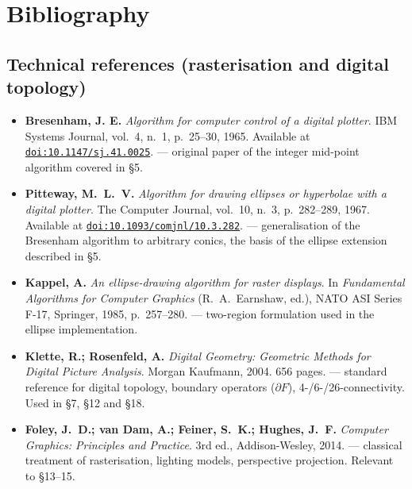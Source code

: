 \documentclass[12pt,a4paper]{scrartcl}
\newcommand{\biblink}[2]{\href{#1}{\nolinkurl{#2}}}
\begin{document}
\section*{\color{accent}Bibliography}
\label{sec:bib}

\subsection*{Technical references (rasterisation and digital topology)}

\begin{itemize}[leftmargin=1.4em,itemsep=0.3em,topsep=0.3em]
  \item \textbf{Bresenham, J. E.} \emph{Algorithm for computer control of a digital plotter}.
        IBM Systems Journal, vol.~4, n.~1, p.~25--30, 1965.
        Available at \biblink{https://doi.org/10.1147/sj.41.0025}{doi:10.1147/sj.41.0025}.
        --- original paper of the integer mid-point algorithm covered in §5.

  \item \textbf{Pitteway, M.~L.~V.} \emph{Algorithm for drawing ellipses or hyperbolae
        with a digital plotter}. The Computer Journal, vol.~10, n.~3, p.~282--289, 1967.
        Available at \biblink{https://doi.org/10.1093/comjnl/10.3.282}{doi:10.1093/comjnl/10.3.282}.
        --- generalisation of the Bresenham algorithm to arbitrary conics, the basis of the ellipse extension described in §5.

  \item \textbf{Kappel, A.} \emph{An ellipse-drawing algorithm for raster displays}.
        In \emph{Fundamental Algorithms for Computer Graphics} (R.~A.~Earnshaw, ed.),
        NATO ASI Series F-17, Springer, 1985, p.~257--280.
        --- two-region formulation used in the ellipse implementation.

  \item \textbf{Klette, R.; Rosenfeld, A.} \emph{Digital Geometry: Geometric Methods
        for Digital Picture Analysis}. Morgan Kaufmann, 2004. 656 pages.
        --- standard reference for digital topology, boundary operators ($\partial F$), 4-/6-/26-connectivity. Used in §7, §12 and §18.

  \item \textbf{Foley, J.~D.; van Dam, A.; Feiner, S.~K.; Hughes, J.~F.}
        \emph{Computer Graphics: Principles and Practice}. 3rd ed., Addison-Wesley, 2014.
        --- classical treatment of rasterisation, lighting models, perspective projection. Relevant to §13--15.
\end{itemize}
\end{document}
